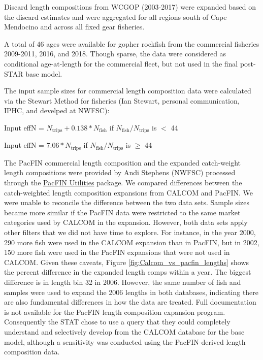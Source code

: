 \documentclass[12pt,]{article}
\begin{document}
Discard length compositions from WCGOP (2003-2017) were expanded based
on the discard estimates and were aggregated for all regions south of
Cape Mendocino and across all fixed gear fisheries.

A total of 46 ages were available for gopher rockfish from the
commercial fisheries 2009-2011, 2016, and 2018. Though sparse, the data
were considered as conditional age-at-length for the commercial fleet,
but not used in the final post-STAR base model.

The input sample sizes for commercial length composition data were
calculated via the Stewart Method for fisheries (Ian Stewart, personal
communication, IPHC, and develped at NWFSC):

\begin{center}

Input effN = $N_{\text{trips}} + 0.138 * N_{\text{fish}}$ if $N_{\text{fish}}/N_{\text{trips}}$ is $<$ 44

Input effN = $7.06 * N_{\text{trips}}$ if $N_{\text{fish}}/N_{\text{trips}}$ is $\geq$ 44

\end{center}

The PacFIN commercial length composition and the expanded catch-weight
length compositions were provided by Andi Stephens (NWFSC) processed
through the
\href{https://github.com/nwfsc-assess/PacFIN.Utilities}{PacFIN
Utilities} package. We compared differences between the catch-weighted
length composition expansions from CALCOM and PacFIN. We were unable to
reconcile the difference between the two data sets. Sample sizes became
more similar if the PacFIN data were restricted to the same market
categories used by CALCOM in the expansion. However, both data sets
apply other filters that we did not have time to explore. For instance,
in the year 2000, 290 more fish were used in the CALCOM expansion than
in PacFIN, but in 2002, 150 more fish were used in the PacFIN expansions
that were not used in CALCOM. Given these caveats, Figure
\ref{fig:Calcom_vs_pacfin_lengths} shows the percent difference in the
expanded length comps within a year. The biggest difference is in length
bin 32 in 2006. However, the same number of fish and samples were used
to expand the 2006 lengths in both databases, indicating there are also
fundamental differences in how the data are treated. Full documentation
is not available for the PacFIN length composition expansion program.
Consequently the STAT chose to use a query that they could completely
understand and selectively develop from the CALCOM database for the base
model, although a sensitivity was conducted using the PacFIN-derived
length composition data.
\end{document}
